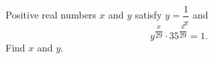 Positive real numbers $x$ and $y$ satisfy $y=\dfrac{1}{x}$ and
\[y^{\dfrac{x}{29}}\cdot35^{\dfrac{x}{29}}=1 .\]
Find $x$ and $y$.
